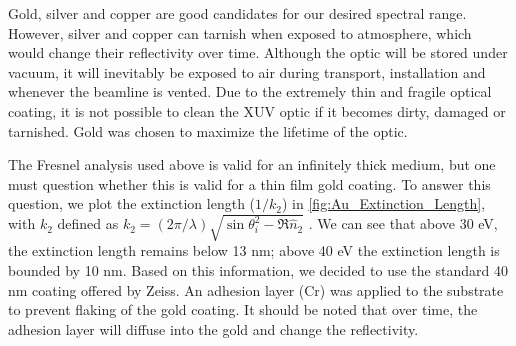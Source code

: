 Gold, silver and copper are good candidates for our desired spectral range. However, silver and copper can tarnish when exposed to atmosphere, which would change their reflectivity over time. Although the optic will be stored under vacuum, it will inevitably be exposed to air during transport, installation and whenever the beamline is vented. Due to the extremely thin and fragile optical coating, it is not possible to clean the XUV optic if it becomes dirty, damaged or tarnished. Gold was chosen to maximize the lifetime of the optic.

The Fresnel analysis used above is valid for an infinitely thick medium, but one must question whether this is valid for a thin film gold coating. To answer this question, we plot the extinction length ($1/k_2$) in \cref{fig:Au_Extinction_Length}, with $k_2$ defined as ${ k_2 = \left( 2 \pi / \lambda \right) \sqrt{ \sin \theta_i^2 - \Re\hat{n}_2} }$ \cite{zangwillModernElectrodynamics2013}. We can see that above 30 eV, the extinction length remains below 13 nm; above 40 eV the extinction length is bounded by 10 nm. Based on this information, we decided to use the standard 40 nm coating offered by Zeiss. An adhesion layer (Cr) was applied to the substrate to prevent flaking of the gold coating. It should be noted that over time, the adhesion layer will diffuse into the gold and change the reflectivity.

